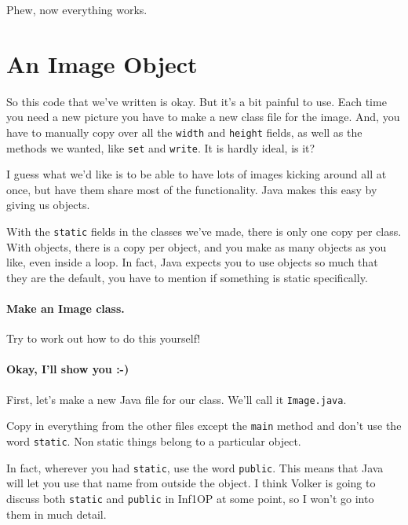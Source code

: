 \documentclass{article}
\begin{document}
            Phew, now everything works.

    \newpage
    \section{An Image Object}
    
        So this code that we've written is okay. But it's a bit painful to use. Each time you need a new picture you have to make a new
        class file for the image. And, you have to manually copy over all the \texttt{width} and \texttt{height} fields, as well as the
        methods we wanted, like \texttt{set} and \texttt{write}. It is hardly ideal, is it?
        
        I guess what we'd like is to be able to have lots of images kicking around all at once, but have them share most of the
        functionality. Java makes this easy by giving us objects.
        
        With the \texttt{static} fields in the classes we've made, there is only one copy per class. With objects, there is a copy per
        object, and you make as many objects as you like, even inside a loop. In fact, Java expects you to use objects so much that they
        are the default, you have to mention if something is static specifically.
        
        \paragraph{Make an Image class.}
            Try to work out how to do this yourself!
            
        \paragraph{Okay, I'll show you :-)}
            First, let's make a new Java file for our class. We'll call it \texttt{Image.java}. 
            
            Copy in everything from the other files except the \texttt{main} method and don't use the word \texttt{static}. Non static
            things belong to a particular object.
            
            In fact, wherever you had \texttt{static}, use the word \texttt{public}. This means that Java will let you use that name from
            outside the object. I think Volker is going to discuss both \texttt{static} and \texttt{public} in Inf1OP at some point, so I
            won't go into them in much detail.
\end{document}
